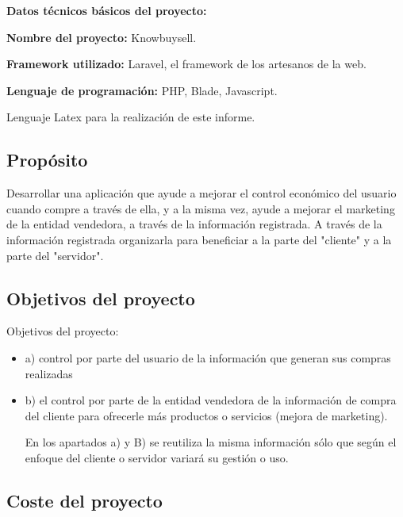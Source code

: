 \documentclass{article}
\begin{document}
\textbf{Datos técnicos básicos del proyecto:}

\textbf{Nombre del proyecto:} Knowbuysell.

\textbf{Framework utilizado:} Laravel, el framework de los artesanos de la web.

\textbf{Lenguaje de programación:} PHP, Blade, Javascript.

Lenguaje Latex para la realización de este informe.

\subsection{Propósito}
Desarrollar una aplicación que ayude a mejorar el control económico del usuario cuando compre a través de ella, y a la misma vez,  ayude a mejorar el marketing de la entidad vendedora, a través de la información registrada. A través de la información registrada organizarla para beneficiar a la parte del "cliente" y a la parte del "servidor".

\subsection{Objetivos del proyecto}
Objetivos del proyecto:
\begin{itemize}
\item a) control por parte del usuario de la información que generan sus compras realizadas  
\item b) el control por parte de la entidad vendedora de la información de compra del cliente para ofrecerle más productos o servicios (mejora de marketing).

En los apartados a) y B) se reutiliza la misma información sólo que según el enfoque del cliente o servidor variará su gestión o uso.
\end{itemize}
\subsection{Coste del proyecto}
\end{document}
